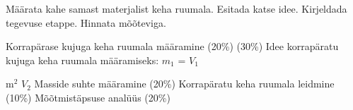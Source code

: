 
Määrata kahe samast materjalist keha ruumala. Esitada katse idee. Kirjeldada tegevuse etappe. Hinnata mõõteviga.

\hint

\solu
Korrapärase kujuga keha ruumala määramine (20\%) (30\%) Idee korrapäratu kujuga keha ruumala määramiseks: $m_1$ = $V_1$

m$^2$ $V_2$ Masside suhte määramine (20\%) Korrapäratu keha ruumala leidmine (10\%) Mõõtmistäpsuse analüüs (20\%)
\probend
